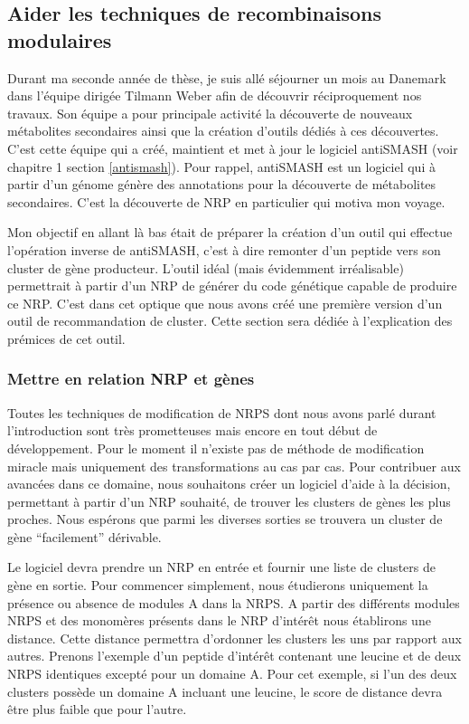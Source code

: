 \subsection{Aider les techniques de recombinaisons modulaires}

Durant ma seconde année de thèse, je suis allé séjourner un mois au Danemark dans l'équipe dirigée Tilmann Weber afin de découvrir réciproquement nos travaux.
Son équipe a pour principale activité la découverte de nouveaux métabolites secondaires ainsi que la création d'outils dédiés à ces découvertes.
C'est cette équipe qui a créé, maintient et met à jour le logiciel antiSMASH (voir chapitre 1 section \ref{antismash}).
Pour rappel, antiSMASH est un logiciel qui à partir d'un génome génère des annotations pour la découverte de métabolites secondaires.
C'est la découverte de NRP en particulier qui motiva mon voyage.

Mon objectif en allant là bas était de préparer la création d'un outil qui effectue l'opération inverse de antiSMASH, c'est à dire remonter d'un peptide vers son cluster de gène producteur.
L'outil idéal (mais évidemment irréalisable) permettrait à partir d'un NRP de générer du code génétique capable de produire ce NRP.
C'est dans cet optique que nous avons créé une première version d'un outil de recommandation de cluster.
Cette section sera dédiée à l'explication des prémices de cet outil.


\subsubsection{Mettre en relation NRP et gènes}

Toutes les techniques de modification de NRPS dont nous avons parlé durant l'introduction sont très prometteuses mais encore en tout début de développement.
Pour le moment il n'existe pas de méthode de modification miracle mais uniquement des transformations au cas par cas.
Pour contribuer aux avancées dans ce domaine, nous souhaitons créer un logiciel d'aide à la décision, permettant à partir d'un NRP souhaité, de trouver les clusters de gènes les plus proches.
Nous espérons que parmi les diverses sorties se trouvera un cluster de gène ``facilement'' dérivable.

Le logiciel devra prendre un NRP en entrée et fournir une liste de clusters de gène en sortie.
Pour commencer simplement, nous étudierons uniquement la présence ou absence de modules A dans la NRPS.
A partir des différents modules NRPS et des monomères présents dans le NRP d'intérêt nous établirons une distance.
Cette distance permettra d'ordonner les clusters les uns par rapport aux autres.
Prenons l'exemple d'un peptide d'intérêt contenant une leucine et de deux NRPS identiques excepté pour un domaine A.
Pour cet exemple, si l'un des deux clusters possède un domaine A incluant une leucine, le score de distance devra être plus faible que pour l'autre.

